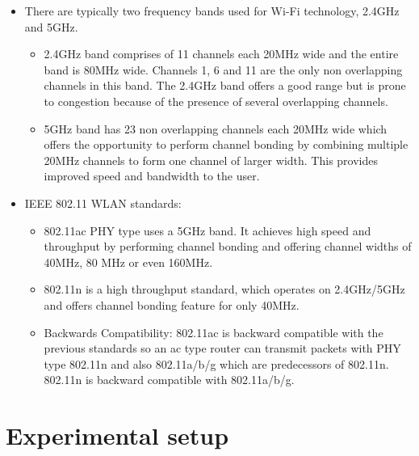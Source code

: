 \documentclass{article}
\begin{document}
\begin{itemize}
    \item There are typically two frequency bands used for Wi-Fi technology, 2.4GHz and 5GHz.
    \begin{itemize}
        \item 2.4GHz band comprises of 11 channels each 20MHz wide and the entire band is 80MHz wide. Channels 1, 6 and 11 are the only non overlapping channels in this band. The 2.4GHz band offers a good range but is prone to congestion because of the presence of several overlapping channels.
        \item 5GHz band has 23 non overlapping channels each 20MHz wide which offers the opportunity to perform channel bonding by combining multiple 20MHz channels to form one channel of larger width. This provides improved speed and bandwidth to the user.
    \end{itemize}
    \item IEEE 802.11 WLAN standards:
    \begin{itemize}
        \item 802.11ac PHY type uses a 5GHz band. It achieves high speed and throughput by performing channel bonding and offering channel widths of 40MHz, 80 MHz or even 160MHz.
        \item 802.11n is a high throughput standard, which operates on 2.4GHz/5GHz and offers channel bonding feature for only 40MHz.
        \item Backwards Compatibility: 802.11ac is backward compatible with the previous standards so an ac type router can transmit packets with PHY type 802.11n and also 802.11a/b/g which are predecessors of 802.11n. 802.11n is backward compatible with 802.11a/b/g.
    \end{itemize}
\end{itemize}

\section{Experimental setup}
\end{document}
